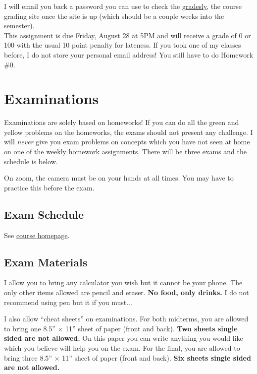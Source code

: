 \documentclass[12pt]{article}
\newcommand{\inred}[1]{\color{red}\textbf{#1} \color{black}}
\newcommand{\coursewebpage}{\href{https://github.com/kapelner/QC_Math_369_Fall_2020}{course homepage}}
\newcommand{\qu}[1]{``#1''}
\begin{document}
I will email you back a password you can use to check the \href{http://gradesly.com}{gradesly}, the course grading site once the site is up (which should be a couple weeks into the semester). \\

This assignment is due Friday, August 28 at 5PM and will receive a grade of 0 or 100 with the usual 10 point penalty for lateness. If you took one of my classes before, I do not store your personal email address! You still have to do Homework \#0.


\section*{Examinations}

Examinations are solely based on homeworks! If you can do all the green and yellow problems on the homeworks, the exams should not present any challenge. I will \textit{never} give you exam problems on concepts which you have not seen at home on one of the weekly homework assignments. There will be three exams and the schedule is below.

On zoom, the camera must be on your hands at all times. You may have to practice this before the exam.

\subsection*{Exam Schedule}\label{subsec:exam_schedule}

See \coursewebpage.

\subsection*{Exam Materials}

I allow you to bring any calculator you wish but it cannot be your phone. The only other items allowed are pencil and eraser. \inred{No food, only drinks.} I do not recommend using pen but it if you must...

I also allow \qu{cheat sheets} on examinations. For both midterms, you are allowed to bring one 8.5'' $\times$ 11'' sheet of paper (front and back). \inred{Two sheets single sided are not allowed.} On this paper you can write anything you would like which you believe will help you on the exam. For the final, you are allowed to bring three 8.5'' $\times$ 11'' sheet of paper (front and back). \inred{Six sheets single sided are not allowed.} %
\end{document}
